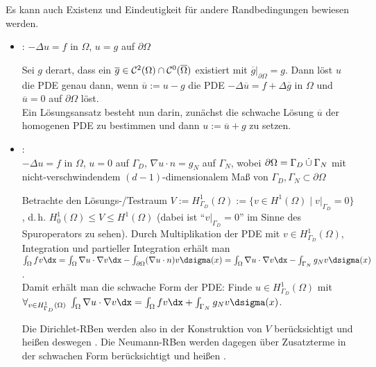 \begin{Bem}
    Es kann auch Existenz und Eindeutigkeit für andere Randbedingungen bewiesen werden.
    \begin{itemize}
        \item
        :
        $-\Delta u = f$ in $\Omega$, $u = g$ auf $\partial\Omega$

        Sei $g$ derart, dass ein $\overline{g} \in \mathcal{C}^2(\Omega) \cap \mathcal{C}^0(\overline{\Omega})$
        existiert mit $\overline{g}|_{\partial\Omega} = g$.
        Dann löst $u$ die PDE genau dann, wenn $\overline{u} := u - g$ die PDE
        $-\Delta \overline{u} = f + \Delta\overline{g}$ in $\Omega$ und
        $\overline{u} = 0$ auf $\partial\Omega$ löst.\\
        Ein Lösungsansatz besteht nun darin, zunächst die schwache Lösung
        $\overline{u}$ der homogenen PDE zu bestimmen und dann
        $u := \overline{u} + g$ zu setzen.

        \item
        :\\
        $-\Delta u = f$ in $\Omega$, $u = 0$ auf $\Gamma_D$,
        $\nabla u \cdot n = g_N$ auf $\Gamma_N$, wobei
        $\partial\Omega = \Gamma_D \mathbin{\dot{\cup}} \Gamma_N$ mit
        nicht-verschwindendem $(d-1)$-dimensionalem Maß von
        $\Gamma_D, \Gamma_N \subset \partial\Omega$

        Betrachte den Lösungs-/Testraum
        $V := H^1_{\Gamma_D}(\Omega) := \{v \in H^1(\Omega) \;|\; v|_{\Gamma_D} = 0\}$,
        d.\,h. $H^1_0(\Omega) \le V \le H^1(\Omega)$
        (dabei ist "`$v|_{\Gamma_D} = 0$"' im Sinne des Spuroperators zu sehen).
        Durch Multiplikation der PDE mit $v \in H^1_{\Gamma_D}(\Omega)$,
        Integration und partieller Integration erhält man
        $\int_\Omega fv \dx = \int_\Omega \nabla u \cdot \nabla v \dx -
        \int_{\partial\Omega} (\nabla u \cdot n) v \dsigma(x) =
        \int_\Omega \nabla u \cdot \nabla v \dx -
        \int_{\Gamma_N} g_N v \dsigma(x)$.\\
        Damit erhält man die schwache Form der PDE:
        Finde $u \in H^1_{\Gamma_D}(\Omega)$ mit\\
        $\forall_{v \in H^1_{\Gamma_D}(\Omega)}\;
        \int_\Omega \nabla u \cdot \nabla v \dx
        = \int_\Omega fv \dx + \int_{\Gamma_N} g_N v \dsigma(x)$.

        Die Dirichlet-RBen werden also in der Konstruktion von $V$ berücksichtigt und
        heißen deswegen .
        Die Neumann-RBen werden dagegen über Zusatzterme in der schwachen Form berücksichtigt und
        heißen .
    \end{itemize}
\end{Bem}


